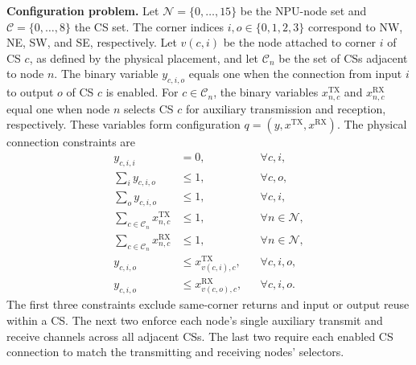 \documentclass[conference,10pt]{IEEEtran}
\begin{document}
\noindent\textbf{Configuration problem.}
Let $\mathcal N=\{0,\ldots,15\}$ be the NPU-node set and
$\mathcal C=\{0,\ldots,8\}$ the CS set. The corner indices
$i,o\in\{0,1,2,3\}$ correspond to NW, NE, SW, and SE, respectively.
Let $v(c,i)$ be the node attached to corner $i$ of CS $c$, as defined by the
physical placement, and let $\mathcal C_n$ be the set of CSs adjacent to node $n$.
The binary variable $y_{c,i,o}$ equals one when the connection from input $i$
to output $o$ of CS $c$ is enabled. For $c\in\mathcal C_n$, the binary
variables $x^{\mathrm{TX}}_{n,c}$ and $x^{\mathrm{RX}}_{n,c}$ equal one when
node $n$ selects CS $c$ for auxiliary transmission and reception, respectively.
These variables form configuration $q=(y,x^{\mathrm{TX}},x^{\mathrm{RX}})$.
The physical connection constraints are
\begin{align}
 y_{c,i,i}&=0, & &\forall c,i,\label{eq:noc-no-return}\\
 \sum_i y_{c,i,o}&\leq1, & &\forall c,o,\label{eq:noc-output}\\
 \sum_o y_{c,i,o}&\leq1, & &\forall c,i,\label{eq:noc-input}\\
 \sum_{c\in\mathcal C_n}x^{\mathrm{TX}}_{n,c}&\leq1,
 & &\forall n\in\mathcal N,\label{eq:noc-node-tx}\\
 \sum_{c\in\mathcal C_n}x^{\mathrm{RX}}_{n,c}&\leq1,
 & &\forall n\in\mathcal N,\label{eq:noc-node-rx}\\
 y_{c,i,o}&\leq x^{\mathrm{TX}}_{v(c,i),c},
 & &\forall c,i,o,\label{eq:noc-tx-match}\\
 y_{c,i,o}&\leq x^{\mathrm{RX}}_{v(c,o),c},
 & &\forall c,i,o.\label{eq:noc-rx-match}
\end{align}
The first three constraints exclude same-corner returns and input or output
reuse within a CS. The next two enforce each node's single auxiliary transmit
and receive channels across all adjacent CSs. The last two require each
enabled CS connection to match the transmitting and receiving nodes' selectors.
\end{document}
